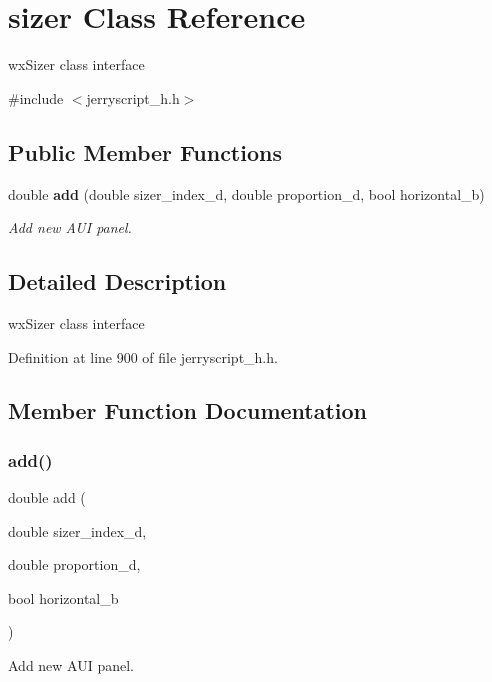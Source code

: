 \section{sizer Class Reference}
\label{classsizer}


wx\+Sizer class interface  




{\ttfamily \#include $<$jerryscript\+\_\+h.\+h$>$}

\subsection*{Public Member Functions}
\begin{DoxyCompactItemize}
\item 
double \textbf{ add} (double sizer\+\_\+index\+\_\+d, double proportion\+\_\+d, bool horizontal\+\_\+b)
\begin{DoxyCompactList}\small\item\em Add new A\+UI panel. \end{DoxyCompactList}\end{DoxyCompactItemize}


\subsection{Detailed Description}
wx\+Sizer class interface 

Definition at line 900 of file jerryscript\+\_\+h.\+h.



\subsection{Member Function Documentation}
\mbox{\label{classsizer_a48f0ed15ee95563920d7e4cd551bebe8}} 
\subsubsection{add()}
{\footnotesize\ttfamily double add (\begin{DoxyParamCaption}\item[{double}]{sizer\+\_\+index\+\_\+d,  }\item[{double}]{proportion\+\_\+d,  }\item[{bool}]{horizontal\+\_\+b }\end{DoxyParamCaption})}



Add new A\+UI panel. 


